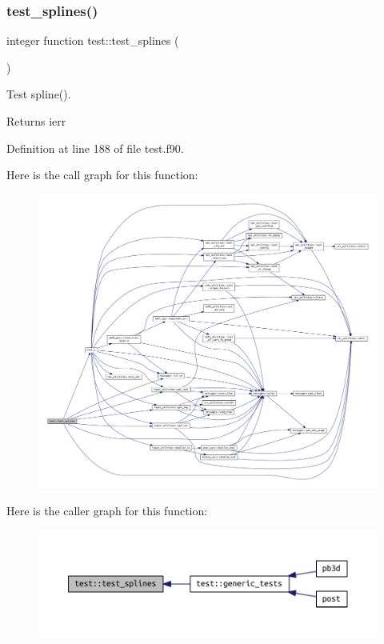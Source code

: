 \subsubsection{\texorpdfstring{test\+\_\+splines()}{test\_splines()}}
{\footnotesize\ttfamily integer function test\+::test\+\_\+splines (\begin{DoxyParamCaption}{ }\end{DoxyParamCaption})}



Test spline(). 

\begin{DoxyReturn}{Returns}
ierr 
\end{DoxyReturn}


Definition at line 188 of file test.\+f90.

Here is the call graph for this function\+:\nopagebreak
\begin{figure}[H]
\begin{center}
\leavevmode
\includegraphics[width=350pt]{namespacetest_a53c6b3d654d4577af301fe3b04473d6a_cgraph}
\end{center}
\end{figure}
Here is the caller graph for this function\+:\nopagebreak
\begin{figure}[H]
\begin{center}
\leavevmode
\includegraphics[width=350pt]{namespacetest_a53c6b3d654d4577af301fe3b04473d6a_icgraph}
\end{center}
\end{figure}
\mbox{\label{namespacetest_ab595ec935321ea0b1168593fb88fad22}} 
